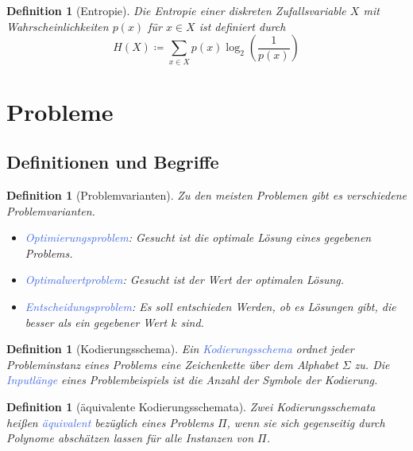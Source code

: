 \documentclass[11pt]{article}
\newcommand{\tcol}[1]{\textcolor{RoyalBlue}{#1}}
\theoremstyle{break}
\newtheorem{defi}[satz]{Definition}
\begin{document}
\begin{defi}[Entropie]
Die Entropie einer diskreten Zufallsvariable $X$ mit Wahrscheinlichkeiten $p(x)$ für $x\in X$ ist definiert durch
\[H(X)\coloneqq\sum_{x\in X}p(x)\log_2\left(\frac{1}{p(x)}\right)\]
\end{defi}




\section{Probleme}


\subsection{Definitionen und Begriffe}

\begin{defi}[Problemvarianten]
Zu den meisten Problemen gibt es verschiedene Problemvarianten.
\begin{itemize}
\item \tcol{Optimierungsproblem}: Gesucht ist die optimale Lösung eines gegebenen Problems.
\item \tcol{Optimalwertproblem}: Gesucht ist der Wert der optimalen Lösung.
\item \tcol{Entscheidungsproblem}: Es soll entschieden Werden, ob es Lösungen gibt, die besser als ein gegebener Wert $k$ sind.
\end{itemize}
\end{defi}

\begin{defi}[Kodierungsschema]
Ein \tcol{Kodierungsschema} ordnet jeder Probleminstanz eines Problems eine Zeichenkette über dem Alphabet $\Sigma$ zu. Die \tcol{Inputlänge} eines Problembeispiels ist die Anzahl der Symbole der Kodierung.
\end{defi}

\begin{defi}[äquivalente Kodierungsschemata]
Zwei Kodierungsschemata heißen \tcol{äquivalent} bezüglich eines Problems $\Pi$, wenn sie sich gegenseitig durch Polynome abschätzen lassen für alle Instanzen von $\Pi$.
\end{defi}
\end{document}
